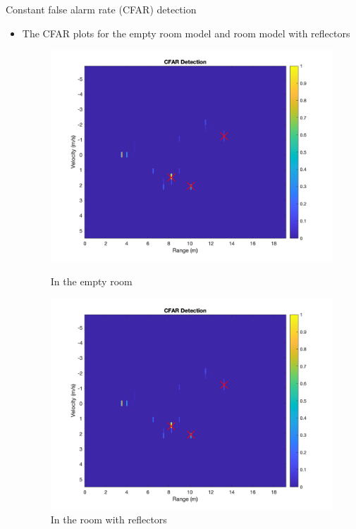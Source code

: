 \documentclass{beamer}
\begin{document}
\begin{frame}[t]{Constant false alarm rate (CFAR) detection}
	\begin{itemize}
        \item The CFAR plots for the empty room model and room model with reflectors
         \vspace{0.5\baselineskip}
            \begin{figure}
                \centering
                \begin{minipage}{0.45\textwidth}
                    \centering
                    \includegraphics[height=0.8\textwidth]{figures/2c_empty_pre.png}
                    \caption{In the empty room}
                \end{minipage}
                \begin{minipage}{0.45\textwidth}
                    \centering
                    \includegraphics[height=0.8\textwidth]{figures/2c_reflectors_pre.png}
                    \caption{In the room with reflectors}
                \end{minipage}
            \end{figure}
    \end{itemize}
\end{frame}
\end{document}
